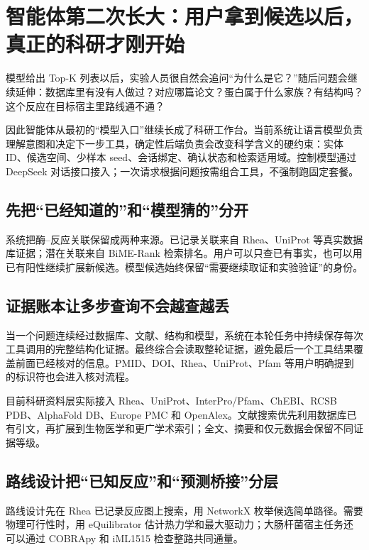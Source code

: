 \documentclass[11pt,a4paper]{ctexart}
\begin{document}
\section{智能体第二次长大：用户拿到候选以后，真正的科研才刚开始}

模型给出 Top-K 列表以后，实验人员很自然会追问“为什么是它？”随后问题会继续延伸：数据库里有没有人做过？对应哪篇论文？蛋白属于什么家族？有结构吗？这个反应在目标宿主里路线通不通？

因此智能体从最初的“模型入口”继续长成了科研工作台。当前系统让语言模型负责理解意图和决定下一步工具，确定性后端负责会改变科学含义的硬约束：实体 ID、候选空间、少样本 seed、会话绑定、确认状态和检索适用域。控制模型通过 DeepSeek 对话接口接入\cite{deepseekapi2026}；一次请求根据问题按需组合工具，不强制跑固定套餐。

\subsection{先把“已经知道的”和“模型猜的”分开}

系统把酶--反应关联保留成两种来源。已记录关联来自 Rhea、UniProt 等真实数据库证据\cite{rhea2022,uniprot2025}；潜在关联来自 BiME-Rank 检索排名。用户可以只查已有事实，也可以用已有阳性继续扩展新候选。模型候选始终保留“需要继续取证和实验验证”的身份。

\subsection{证据账本让多步查询不会越查越丢}

当一个问题连续经过数据库、文献、结构和模型，系统在本轮任务中持续保存每次工具调用的完整结构化证据。最终综合会读取整轮证据，避免最后一个工具结果覆盖前面已经核对的信息。PMID、DOI、Rhea、UniProt、Pfam 等用户明确提到的标识符也会进入核对流程。

目前科研资料层实际接入 Rhea\cite{rhea2022}、UniProt\cite{uniprot2025}、InterPro/Pfam\cite{interpro2025}、ChEBI\cite{chebi2010}、RCSB PDB\cite{pdb2025}、AlphaFold DB\cite{alphafolddb2024}、Europe PMC\cite{europepmc2024} 和 OpenAlex\cite{openalex2022}。文献搜索优先利用数据库已有引文，再扩展到生物医学和更广学术索引；全文、摘要和仅元数据会保留不同证据等级。

\subsection{路线设计把“已知反应”和“预测桥接”分层}

路线设计先在 Rhea 已记录反应图上搜索，用 NetworkX 枚举候选简单路径\cite{networkx2008}。需要物理可行性时，用 eQuilibrator 估计热力学和最大驱动力\cite{equilibrator2022}；大肠杆菌宿主任务还可以通过 COBRApy 和 iML1515 检查整路共同通量\cite{cobrapy2013,iml1515}。
\end{document}
